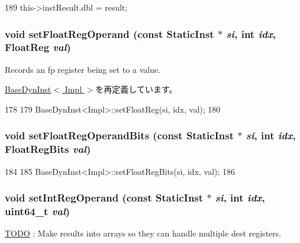 \begin{DoxyCode}
189 { this->instResult.dbl = result; }
\end{DoxyCode}
\hypertarget{classOzoneDynInst_addc8b4b6511725bf8ff48bd09ef22892}{
\subsubsection[{setFloatRegOperand}]{\setlength{\rightskip}{0pt plus 5cm}void setFloatRegOperand (const {\bf StaticInst} $\ast$ {\em si}, \/  int {\em idx}, \/  {\bf FloatReg} {\em val})}}
\label{classOzoneDynInst_addc8b4b6511725bf8ff48bd09ef22892}
Records an fp register being set to a value. 

\hyperlink{classBaseDynInst_addc8b4b6511725bf8ff48bd09ef22892}{BaseDynInst$<$ Impl $>$}を再定義しています。


\begin{DoxyCode}
178     {
179         BaseDynInst<Impl>::setFloatReg(si, idx, val);
180     }
\end{DoxyCode}
\hypertarget{classOzoneDynInst_a80a516966713c873cf964af7538dbd37}{
\subsubsection[{setFloatRegOperandBits}]{\setlength{\rightskip}{0pt plus 5cm}void setFloatRegOperandBits (const {\bf StaticInst} $\ast$ {\em si}, \/  int {\em idx}, \/  {\bf FloatRegBits} {\em val})}}
\label{classOzoneDynInst_a80a516966713c873cf964af7538dbd37}



\begin{DoxyCode}
184     {
185         BaseDynInst<Impl>::setFloatRegBits(si, idx, val);
186     }
\end{DoxyCode}
\hypertarget{classOzoneDynInst_a654e99f2be7cd298378462ce9651bb44}{
\subsubsection[{setIntRegOperand}]{\setlength{\rightskip}{0pt plus 5cm}void setIntRegOperand (const {\bf StaticInst} $\ast$ {\em si}, \/  int {\em idx}, \/  uint64\_\-t {\em val})}}
\label{classOzoneDynInst_a654e99f2be7cd298378462ce9651bb44}
\begin{Desc}
\item[\hyperlink{todo__todo000041}{TODO}]: Make results into arrays so they can handle multiple dest registers. \end{Desc}


